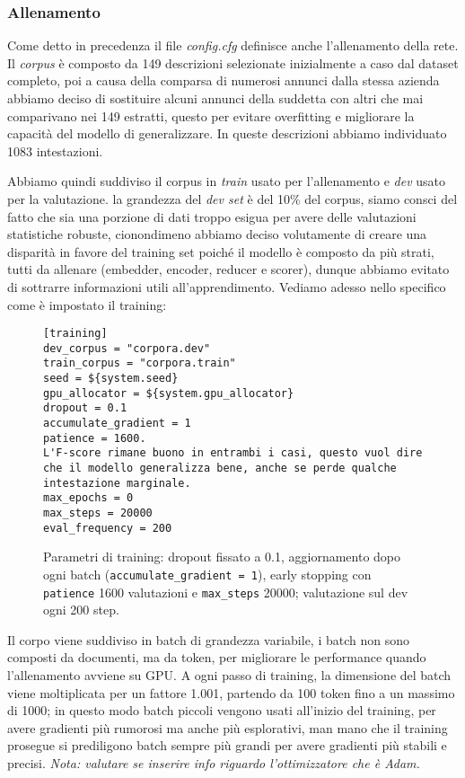 \subsubsection{Allenamento}

\noindent Come detto in precedenza il file \textit{config.cfg} definisce anche l'allenamento della rete. Il \textit{corpus} è composto da 149 descrizioni selezionate inizialmente a caso dal dataset completo, poi a causa della comparsa di numerosi annunci dalla stessa azienda abbiamo deciso di sostituire alcuni annunci della suddetta con altri che mai comparivano nei 149 estratti, questo per evitare overfitting e migliorare la capacità del modello di generalizzare. In queste descrizioni abbiamo individuato 1083 intestazioni.

\noindent Abbiamo quindi suddiviso il corpus in \textit{train} usato per l'allenamento e \textit{dev} usato per la valutazione. la grandezza del \textit{dev set} è del 10\% del corpus, siamo consci del fatto che sia una porzione di dati troppo esigua per avere delle valutazioni statistiche robuste, cionondimeno abbiamo deciso volutamente di creare una disparità in favore del training set poiché il modello è composto da più strati, tutti da allenare (embedder, encoder, reducer e scorer), dunque abbiamo evitato di sottrarre informazioni utili all'apprendimento. Vediamo adesso nello specifico come è impostato il training:

\begin{figure}[H]
    \centering
    \scriptsize
\begin{lstlisting}[style=cmd]
[training]
dev_corpus = "corpora.dev"
train_corpus = "corpora.train"
seed = ${system.seed}
gpu_allocator = ${system.gpu_allocator}
dropout = 0.1
accumulate_gradient = 1
patience = 1600.
L'F-score rimane buono in entrambi i casi, questo vuol dire che il modello generalizza bene, anche se perde qualche intestazione marginale.
max_epochs = 0
max_steps = 20000
eval_frequency = 200
\end{lstlisting}
    \caption{Parametri di training: dropout fissato a 0.1, aggiornamento dopo ogni batch (\texttt{accumulate\_gradient = 1}), early stopping con \texttt{patience} 1600 valutazioni e \texttt{max\_steps} 20000; valutazione sul dev ogni 200 step.}
    \label{fig:cfg-training}
\end{figure}

\noindent Il corpo viene suddiviso in batch di grandezza variabile, i batch non sono composti da documenti, ma da token, per migliorare le performance quando l'allenamento avviene su GPU. A ogni passo di training, la dimensione del batch viene moltiplicata per un fattore 1.001, partendo da 100 token fino a un massimo di 1000; in questo modo batch piccoli vengono usati all'inizio del training, per avere gradienti più rumorosi ma anche più esplorativi, man mano che il training prosegue si prediligono batch sempre più grandi per avere gradienti più stabili e precisi. \textit{Nota: valutare se inserire info riguardo l'ottimizzatore che è Adam.}


